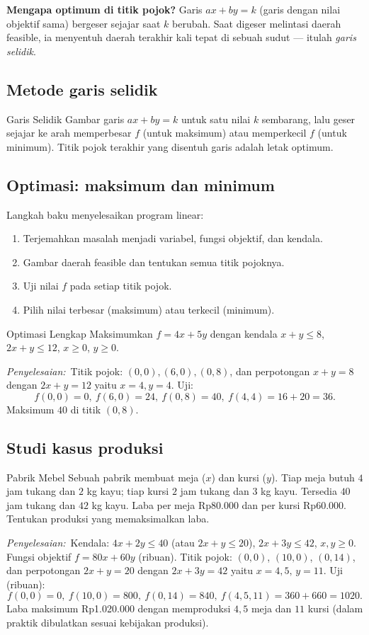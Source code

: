 \documentclass[11pt,a4paper]{report}
\theoremstyle{gaya}
\newcommand{\jawab}{\par\smallskip\noindent\textit{\textcolor{oranye}{Penyelesaian:}}\ }
\begin{document}
\textbf{Mengapa optimum di titik pojok?} Garis $ax+by=k$ (garis dengan nilai objektif sama) bergeser sejajar saat $k$ berubah. Saat digeser melintasi daerah feasible, ia menyentuh daerah terakhir kali tepat di sebuah sudut --- itulah \emph{garis selidik}.

\subsection*{Metode garis selidik}
\begin{konsep}{Garis Selidik}
Gambar garis $ax+by=k$ untuk satu nilai $k$ sembarang, lalu geser sejajar ke arah memperbesar $f$ (untuk maksimum) atau memperkecil $f$ (untuk minimum). Titik pojok terakhir yang disentuh garis adalah letak optimum.
\end{konsep}

\subsection*{Optimasi: maksimum dan minimum}
Langkah baku menyelesaikan program linear:
\begin{enumerate}[leftmargin=*,topsep=2pt]
  \item Terjemahkan masalah menjadi variabel, fungsi objektif, dan kendala.
  \item Gambar daerah feasible dan tentukan semua titik pojoknya.
  \item Uji nilai $f$ pada setiap titik pojok.
  \item Pilih nilai terbesar (maksimum) atau terkecil (minimum).
\end{enumerate}

\begin{contoh}{Optimasi Lengkap}
Maksimumkan $f=4x+5y$ dengan kendala $x+y\le 8$, $2x+y\le 12$, $x\ge0$, $y\ge0$.

\jawab Titik pojok: $(0,0),(6,0),(0,8)$, dan perpotongan $x+y=8$ dengan $2x+y=12$ yaitu $x=4,y=4$. Uji:
\[
f(0,0)=0,\ f(6,0)=24,\ f(0,8)=40,\ f(4,4)=16+20=36.
\]
Maksimum $40$ di titik $(0,8)$.
\end{contoh}

\subsection*{Studi kasus produksi}
\begin{studikasus}{Pabrik Mebel}
Sebuah pabrik membuat meja ($x$) dan kursi ($y$). Tiap meja butuh $4$ jam tukang dan $2$ kg kayu; tiap kursi $2$ jam tukang dan $3$ kg kayu. Tersedia $40$ jam tukang dan $42$ kg kayu. Laba per meja Rp80.000 dan per kursi Rp60.000. Tentukan produksi yang memaksimalkan laba.

\smallskip
\jawab Kendala: $4x+2y\le40$ (atau $2x+y\le20$), $2x+3y\le42$, $x,y\ge0$. Fungsi objektif $f=80x+60y$ (ribuan). Titik pojok: $(0,0)$, $(10,0)$, $(0,14)$, dan perpotongan $2x+y=20$ dengan $2x+3y=42$ yaitu $x=4{,}5,\,y=11$. Uji (ribuan):
\[
f(0,0)=0,\ f(10,0)=800,\ f(0,14)=840,\ f(4{,}5,11)=360+660=1020.
\]
Laba maksimum Rp1.020.000 dengan memproduksi $4{,}5$ meja dan $11$ kursi (dalam praktik dibulatkan sesuai kebijakan produksi).
\end{studikasus}
\end{document}
